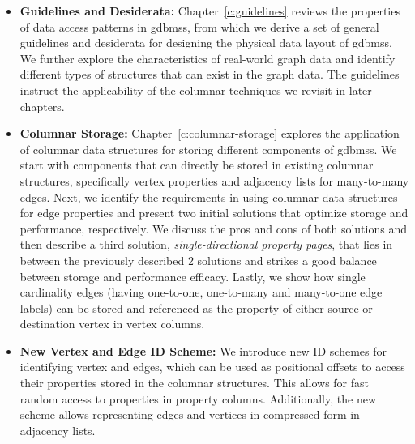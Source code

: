 \begin{itemize}
	\item \textbf{Guidelines and Desiderata:} Chapter~\ref{c:guidelines} reviews the properties of data access patterns in \gls{gdbms}s, from which we derive a set of general guidelines and desiderata for designing the physical data layout of \gls{gdbms}s. We further explore the characteristics of real-world graph data and identify different types of structures that can exist in the graph data. The guidelines instruct the applicability of the columnar techniques we revisit in later chapters.%
	
	\item \textbf{Columnar Storage:} Chapter~\ref{c:columnar-storage} explores the application of columnar data structures for storing different components of \gls{gdbms}s. We start with components that can directly be stored in existing columnar structures, specifically vertex properties and adjacency lists for many-to-many edges. Next, we identify the requirements in using columnar data structures for edge properties and present two initial solutions that optimize storage and performance, respectively. We discuss the pros and cons of both solutions and then describe a third solution, \emph{single-directional property pages}, that lies in between the previously described 2 solutions and strikes a good balance between storage and performance efficacy. Lastly, we show how single cardinality edges (having one-to-one, one-to-many and many-to-one edge labels) can be stored and referenced as the property of either source or destination vertex in vertex columns. %
	
	\item \textbf{New Vertex and Edge ID Scheme:} We introduce new ID schemes for identifying vertex and edges, which can be used as positional offsets to access their properties stored in the columnar structures. This allows for fast random access to properties in property columns. Additionally, the new scheme allows representing edges and vertices in compressed form in adjacency lists. 
	

\end{itemize}

